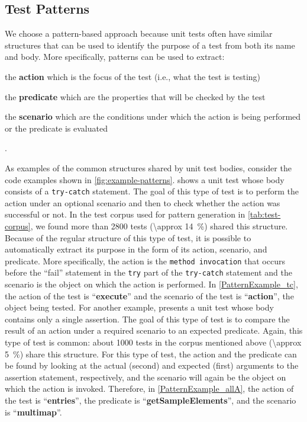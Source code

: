 \documentclass[proposal.tex]{subfiles}
\begin{document}
\subsection{Test Patterns}
\label{sec:test_patterns}


We choose a pattern-based approach because unit tests often have similar structures that can be used to identify the purpose of a test from both its name and body.
%
More specifically, patterns can be used to extract:
\begin{enumerate*}
    \item the \textbf{action} which is the focus of the test (i.e., what the test is testing)
    \item the \textbf{predicate} which are the properties that will be checked by the test
    \item the \textbf{scenario} which are the conditions under which the action is being performed or the predicate is evaluated
\end{enumerate*}.


As examples of the common structures shared by unit test bodies, consider the code examples shown in \cref{fig:example-patterns}.
%
 shows a unit test whose body consists of a \texttt{try-catch} statement.
%
The goal of this type of test is to perform the action under an optional scenario and then to check whether the action was successful or not.
%
In the test corpus used for pattern generation in \cref{tab:test-corpus}, we found more than \num{2800} tests (\SI{\approx 14}{\percent}) shared this structure.
%
Because of the regular structure of this type of test, it is possible to automatically extract its purpose in the form of its action, scenario, and predicate.
%
More specifically, the action is the \texttt{method invocation} that occurs before the \enquote{fail} statement in the \texttt{try} part of the \texttt{try-catch} statement and the scenario is the object on which the action is performed.
%
In \cref{PatternExample_tc}, the action of the test is \enquote{\textbf{execute}} and the scenario of the test is \enquote{\textbf{action}}, the object being tested.
%
For another example,  presents a unit test whose body contains only a single assertion.
%
The goal of this type of test is to compare the result of an action under a required scenario to an expected predicate.
% 
Again, this type of test is common: about \num{1000} tests in the corpus mentioned above (\SI{\approx 5}{\percent}) share this structure.
%
For this type of test, the action and the predicate can be found by looking at the actual (second) and expected (first) arguments to the assertion statement, respectively, and the scenario will again be the object on which the action is invoked.
%
Therefore, in \cref{PatternExample_allA}, the action of the test is \enquote{\textbf{entries}}, the predicate is \enquote{\textbf{getSampleElements}}, and the scenario is \enquote{\textbf{multimap}}.
\end{document}
